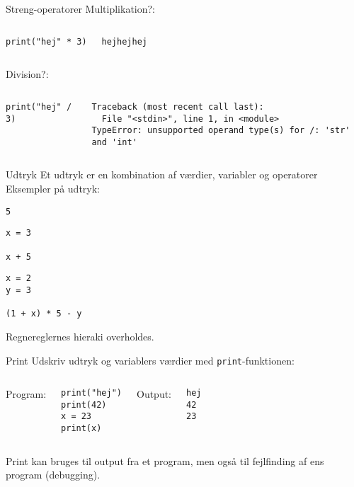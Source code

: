 \begin{frame}[fragile]{Streng-operatorer}
	Multiplikation?:
	\begin{columns}
		\begin{lstlisting}[style=python]
print("hej" * 3)
		\end{lstlisting}
		\pause
		\begin{lstlisting}[style=python]
hejhejhej
		\end{lstlisting}
	\end{columns}
	\pause
	Division?:
	\begin{columns}
		\column{0.4\textwidth}
		\begin{lstlisting}[style=python]
print("hej" / 3)
		\end{lstlisting}
		\pause
		\column{0.4\textwidth}
		\begin{lstlisting}[style=python]
Traceback (most recent call last):
  File "<stdin>", line 1, in <module>
TypeError: unsupported operand type(s) for /: 'str' and 'int'
		\end{lstlisting}
	\end{columns}
\end{frame}

\begin{frame}[fragile]{Udtryk}
	Et udtryk er en kombination af værdier, variabler og operatorer\\
	Eksempler på udtryk:
	\begin{lstlisting}[style=python]
5
	\end{lstlisting}
	\begin{lstlisting}[style=python]
x = 3

x + 5
	\end{lstlisting}
	\begin{lstlisting}[style=python]
x = 2
y = 3

(1 + x) * 5 - y
	\end{lstlisting}
	Regnereglernes hieraki overholdes.
\end{frame}

\begin{frame}[fragile]{Print}
	Udskriv udtryk og variablers værdier med \texttt{print}-funktionen:
	\bigskip
	\begin{columns}
		Program:
		\begin{lstlisting}[style=python]
print("hej")
print(42)
x = 23
print(x)
		\end{lstlisting}
		Output:
		\begin{lstlisting}[style=python]
hej
42
23
		\end{lstlisting}
	\end{columns}
	Print kan bruges til output fra et program, men også til fejlfinding af ens program (debugging).
\end{frame}

